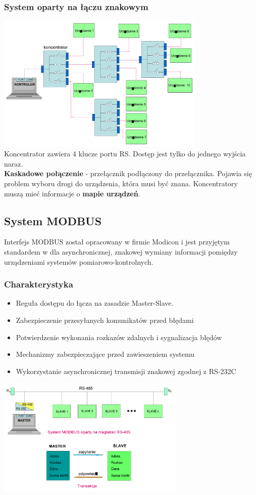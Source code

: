 		\subsubsection{System oparty na łączu znakowym}
		\includegraphics[width=10cm]{./wyklady/RS232_15_1.pdf}\\
		Koncentrator zawiera 4 klucze portu RS. Dostęp jest tylko do jednego wyjścia naraz.\\
		\textbf{Kaskadowe połączenie} - przełącznik podłączony do przełącznika. Pojawia się problem wyboru drogi do urządzenia, która musi być znana. Koncentratory muszą mieć informacje o \textbf{mapie urządzeń}.
	\subsection{System MODBUS}
		Interfejs MODBUS został opracowany w firmie Modicon i jest przyjętym standardem w dla asynchronicznej, znakowej wymiany informacji pomiędzy urządzeniami systemów pomiarowo-kontrolnych.
		\subsubsection{Charakterystyka}
			\begin{itemize}
				\item Reguła dostępu do łącza na zasadzie Master-Slave. 
				\item Zabezpieczenie przesyłanych komunikatów przed błędami
				\item Potwierdzenie wykonania rozkazów zdalnych i sygnalizacja błędów
				\item Mechanizmy zabezpieczające przed zawieszeniem systemu
				\item Wykorzystanie asynchronicznej transmisji znakowej zgodnej z RS-232C
			\end{itemize}
		\includegraphics[width=9cm]{./wyklady/RS232_16_1.pdf}\\
